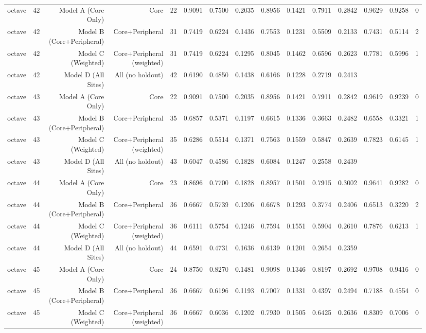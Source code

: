 {\begin{longtable}{lrrrrrrrrrrrrrr}
  octave & 42 & Model A (Core Only) & Core & 22 & 0.9091 & 0.7500 & 0.2035 & 0.8956 & 0.1421 & 0.7911 & 0.2842 & 0.9629 & 0.9258 & 0 \\
  octave & 42 & Model B (Core+Peripheral) & Core+Peripheral & 31 & 0.7419 & 0.6224 & 0.1436 & 0.7553 & 0.1231 & 0.5509 & 0.2133 & 0.7431 & 0.5114 & 2 \\
  octave & 42 & Model C (Weighted) & Core+Peripheral (weighted) & 31 & 0.7419 & 0.6224 & 0.1295 & 0.8045 & 0.1462 & 0.6596 & 0.2623 & 0.7781 & 0.5996 & 1 \\
  octave & 42 & Model D (All Sites) & All (no holdout) & 42 & 0.6190 & 0.4850 & 0.1438 & 0.6166 & 0.1228 & 0.2719 & 0.2413 &  &  &  \\
  octave & 43 & Model A (Core Only) & Core & 22 & 0.9091 & 0.7500 & 0.2035 & 0.8956 & 0.1421 & 0.7911 & 0.2842 & 0.9619 & 0.9239 & 0 \\
  octave & 43 & Model B (Core+Peripheral) & Core+Peripheral & 35 & 0.6857 & 0.5371 & 0.1197 & 0.6615 & 0.1336 & 0.3663 & 0.2482 & 0.6558 & 0.3321 & 1 \\
  octave & 43 & Model C (Weighted) & Core+Peripheral (weighted) & 35 & 0.6286 & 0.5514 & 0.1371 & 0.7563 & 0.1559 & 0.5847 & 0.2639 & 0.7823 & 0.6145 & 1 \\
  octave & 43 & Model D (All Sites) & All (no holdout) & 43 & 0.6047 & 0.4586 & 0.1828 & 0.6084 & 0.1247 & 0.2558 & 0.2439 &  &  &  \\
  octave & 44 & Model A (Core Only) & Core & 23 & 0.8696 & 0.7700 & 0.1828 & 0.8957 & 0.1501 & 0.7915 & 0.3002 & 0.9641 & 0.9282 & 0 \\
  octave & 44 & Model B (Core+Peripheral) & Core+Peripheral & 36 & 0.6667 & 0.5739 & 0.1206 & 0.6678 & 0.1293 & 0.3774 & 0.2406 & 0.6513 & 0.3220 & 2 \\
  octave & 44 & Model C (Weighted) & Core+Peripheral (weighted) & 36 & 0.6111 & 0.5754 & 0.1246 & 0.7594 & 0.1551 & 0.5904 & 0.2610 & 0.7876 & 0.6213 & 1 \\
  octave & 44 & Model D (All Sites) & All (no holdout) & 44 & 0.6591 & 0.4731 & 0.1636 & 0.6139 & 0.1201 & 0.2654 & 0.2359 &  &  &  \\
  octave & 45 & Model A (Core Only) & Core & 24 & 0.8750 & 0.8270 & 0.1481 & 0.9098 & 0.1346 & 0.8197 & 0.2692 & 0.9708 & 0.9416 & 0 \\
  octave & 45 & Model B (Core+Peripheral) & Core+Peripheral & 36 & 0.6667 & 0.6196 & 0.1193 & 0.7007 & 0.1331 & 0.4397 & 0.2494 & 0.7188 & 0.4554 & 0 \\
  octave & 45 & Model C (Weighted) & Core+Peripheral (weighted) & 36 & 0.6667 & 0.6036 & 0.1202 & 0.7930 & 0.1505 & 0.6425 & 0.2636 & 0.8309 & 0.7006 & 0 \\

\end{longtable}}
